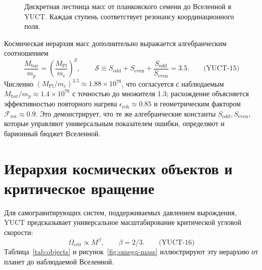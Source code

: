 \documentclass[12pt,a4paper]{article}
\newcommand{\betaf}{\beta}
\newcommand{\Sodd}{S_{\mathrm{odd}}}
\newcommand{\Seven}{S_{\mathrm{even}}}
\newcommand{\Mbar}{M_{\mathrm{bar}}}
\begin{document}
	\begin{figure}[htbp]
		\centering
		\caption{Дискретная лестница масс от планковского семени до Вселенной в YUCT. Каждая ступень соответствует резонансу координационного поля.}
		\label{fig:hierarchy-scheme}
	\end{figure}
	
	Космическая иерархия масс дополнительно выражается алгебраическим соотношением
	\[
	\boxed{\frac{\Mbar}{m_p} = \left(\frac{M_{\mathrm{Pl}}}{m_e}\right)^{\mathcal{S}}},\qquad
	\mathcal{S} \equiv \Sodd + \Seven + \frac{\Sodd}{\Seven} = 3.5. \qquad\text{(YUCT-15)}
	\]
	Численно \((M_{\mathrm{Pl}}/m_e)^{3.5} \approx 1.88\times 10^{78}\), что согласуется с наблюдаемым \(\Mbar/m_p \approx 1.4\times 10^{78}\) с точностью до множителя 1.3; расхождение объясняется эффективностью повторного нагрева \(\epsilon_{\mathrm{reh}}\approx 0.85\) и геометрическим фактором \(\mathcal{F}_{\mathrm{rot}}\approx 0.9\). Это демонстрирует, что те же алгебраические константы \(S_{\mathrm{odd}}, S_{\mathrm{even}}\), которые управляют универсальным показателем ошибки, определяют и барионный бюджет Вселенной.
	
	\section{Иерархия космических объектов и критическое вращение}
	
	Для самогравитирующих систем, поддерживаемых давлением вырождения, YUCT предсказывает универсальное масштабирование критической угловой скорости:
	\[
	\Omega_{\mathrm{crit}} \propto M^{\betaf},\qquad \betaf = 2/3. \qquad\text{(YUCT-16)}
	\]
	Таблица~\ref{tab:objects} и рисунок~\ref{fig:omega-mass} иллюстрируют эту иерархию от планет до наблюдаемой Вселенной.
	
\end{document}
